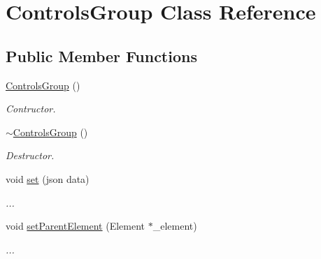\hypertarget{class_controls_group}{}\section{Controls\+Group Class Reference}
\label{class_controls_group}
\subsection*{Public Member Functions}
\begin{DoxyCompactItemize}
\item 
\mbox{\label{class_controls_group_ab5821ef9cf29cb1c338dee833997e8be}} 
\mbox{\hyperlink{class_controls_group_ab5821ef9cf29cb1c338dee833997e8be}{Controls\+Group}} ()
\begin{DoxyCompactList}\small\item\em Contructor. \end{DoxyCompactList}\item 
\mbox{\label{class_controls_group_a191f5c1d1b6b05c4b78448d9249e295a}} 
\mbox{\hyperlink{class_controls_group_a191f5c1d1b6b05c4b78448d9249e295a}{$\sim$\+Controls\+Group}} ()
\begin{DoxyCompactList}\small\item\em Destructor. \end{DoxyCompactList}\item 
\mbox{\label{class_controls_group_ac2a18a055b26b18ce3ab1bc7aa085f7b}} 
void \mbox{\hyperlink{class_controls_group_ac2a18a055b26b18ce3ab1bc7aa085f7b}{set}} (json data)
\begin{DoxyCompactList}\small\item\em ... \end{DoxyCompactList}\item 
\mbox{\label{class_controls_group_a1ca5952b0e990590cff420be29679420}} 
void \mbox{\hyperlink{class_controls_group_a1ca5952b0e990590cff420be29679420}{set\+Parent\+Element}} (Element $\ast$\+\_\+element)
\begin{DoxyCompactList}\small\item\em ... \end{DoxyCompactList}\item 
\mbox{\label{class_controls_group_a591c730dd207bd39152f550c6ff01f94}} 

\end{DoxyCompactItemize}
